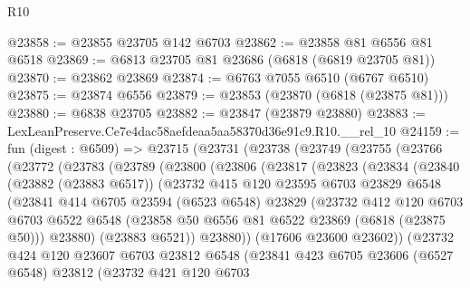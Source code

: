 \begin{lexlean}{R10}
\begin{coremodule}
@23858 := @23855 @23705 @142 @6703
@23862 := @23858 @81 @6556 @81 @6518
@23869 := @6813 @23705 @81 @23686 (@6818 (@6819 @23705 @81))
@23870 := @23862 @23869
@23874 := @6763 @7055 @6510 (@6767 @6510)
@23875 := @23874 @6556
@23879 := @23853 (@23870 (@6818 (@23875 @81)))
@23880 := @6838 @23705
@23882 := @23847 (@23879 @23880)
@23883 := LexLeanPreserve.Ce7e4dac58aefdeaa5aa58370d36e91c9.R10.__rel_10
@24159 := fun (digest : @6509) =>
  @23715
    (@23731
      (@23738
        (@23749
          (@23755
            (@23766
              (@23772
                (@23783
                  (@23789
                    (@23800
                      (@23806
                        (@23817
                          (@23823
                            (@23834
                              (@23840
                                (@23882 (@23883 @6517))
                                (@23732
                                  @415
                                  @120
                                  @23595
                                  @6703
                                  @23829
                                  @6548
                                  (@23841
                                    @414
                                    @6705
                                    @23594
                                    (@6523 @6548)
                                    @23829
                                    (@23732
                                      @412
                                      @120
                                      @6703
                                      @6703
                                      @6522
                                      @6548
                                      (@23858 @50 @6556 @81 @6522 @23869 (@6818 (@23875 @50)))
                                      @23880)
                                    (@23883 @6521))
                                  @23880))
                              (@17606 @23600 @23602))
                            (@23732
                              @424
                              @120
                              @23607
                              @6703
                              @23812
                              @6548
                              (@23841
                                @423
                                @6705
                                @23606
                                (@6527 @6548)
                                @23812
                                (@23732
                                  @421
                                  @120
                                  @6703

\end{coremodule}
\end{lexlean}
